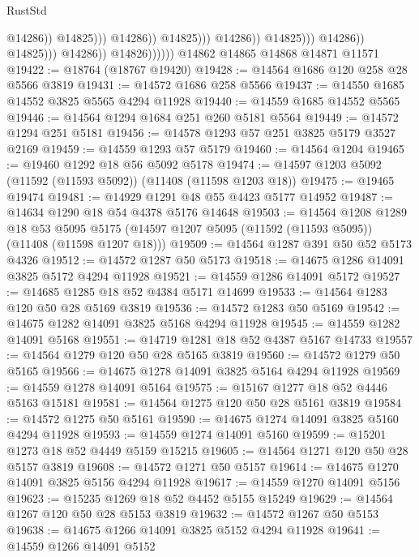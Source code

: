 \begin{lexlean}{RustStd}
\begin{coremodule}
                                                            @14286))
                                                        @14825)))
                                                  @14286))
                                              @14825)))
                                        @14286))
                                    @14825)))
                              @14286))
                          @14825)))
                    @14286))
                @14826))))))
    @14862
    @14865
    @14868
    @14871
    @11571
@19422 := @18764 (@18767 @19420)
@19428 := @14564 @1686 @120 @258 @28 @5566 @3819
@19431 := @14572 @1686 @258 @5566
@19437 := @14550 @1685 @14552 @3825 @5565 @4294 @11928
@19440 := @14559 @1685 @14552 @5565
@19446 := @14564 @1294 @1684 @251 @260 @5181 @5564
@19449 := @14572 @1294 @251 @5181
@19456 := @14578 @1293 @57 @251 @3825 @5179 @3527 @2169
@19459 := @14559 @1293 @57 @5179
@19460 := @14564 @1204
@19465 := @19460 @1292 @18 @56 @5092 @5178
@19474 := @14597 @1203 @5092 (@11592 (@11593 @5092)) (@11408 (@11598 @1203 @18))
@19475 := @19465 @19474
@19481 := @14929 @1291 @48 @55 @4423 @5177 @14952
@19487 := @14634 @1290 @18 @54 @4378 @5176 @14648
@19503 := @14564
    @1208
    @1289
    @18
    @53
    @5095
    @5175
    (@14597 @1207 @5095 (@11592 (@11593 @5095)) (@11408 (@11598 @1207 @18)))
@19509 := @14564 @1287 @391 @50 @52 @5173 @4326
@19512 := @14572 @1287 @50 @5173
@19518 := @14675 @1286 @14091 @3825 @5172 @4294 @11928
@19521 := @14559 @1286 @14091 @5172
@19527 := @14685 @1285 @18 @52 @4384 @5171 @14699
@19533 := @14564 @1283 @120 @50 @28 @5169 @3819
@19536 := @14572 @1283 @50 @5169
@19542 := @14675 @1282 @14091 @3825 @5168 @4294 @11928
@19545 := @14559 @1282 @14091 @5168
@19551 := @14719 @1281 @18 @52 @4387 @5167 @14733
@19557 := @14564 @1279 @120 @50 @28 @5165 @3819
@19560 := @14572 @1279 @50 @5165
@19566 := @14675 @1278 @14091 @3825 @5164 @4294 @11928
@19569 := @14559 @1278 @14091 @5164
@19575 := @15167 @1277 @18 @52 @4446 @5163 @15181
@19581 := @14564 @1275 @120 @50 @28 @5161 @3819
@19584 := @14572 @1275 @50 @5161
@19590 := @14675 @1274 @14091 @3825 @5160 @4294 @11928
@19593 := @14559 @1274 @14091 @5160
@19599 := @15201 @1273 @18 @52 @4449 @5159 @15215
@19605 := @14564 @1271 @120 @50 @28 @5157 @3819
@19608 := @14572 @1271 @50 @5157
@19614 := @14675 @1270 @14091 @3825 @5156 @4294 @11928
@19617 := @14559 @1270 @14091 @5156
@19623 := @15235 @1269 @18 @52 @4452 @5155 @15249
@19629 := @14564 @1267 @120 @50 @28 @5153 @3819
@19632 := @14572 @1267 @50 @5153
@19638 := @14675 @1266 @14091 @3825 @5152 @4294 @11928
@19641 := @14559 @1266 @14091 @5152

\end{coremodule}
\end{lexlean}
